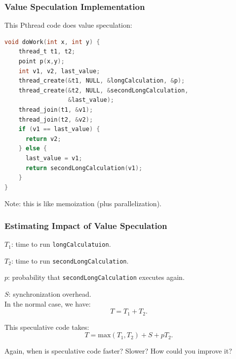 \begin{frame}[fragile]
  \frametitle{Value Speculation Implementation}

  
  This Pthread code does value speculation:
  
  \begin{lstlisting}[language=C]
void doWork(int x, int y) {
    thread_t t1, t2;
    point p(x,y);
    int v1, v2, last_value;
    thread_create(&t1, NULL, &longCalculation, &p);
    thread_create(&t2, NULL, &secondLongCalculation,
                  &last_value);
    thread_join(t1, &v1);
    thread_join(t2, &v2);
    if (v1 == last_value) {
      return v2;
    } else {
      last_value = v1;
      return secondLongCalculation(v1);
    }
}
  \end{lstlisting}

  Note: this is like memoization (plus parallelization).
  
\end{frame}

\begin{frame}
  \frametitle{Estimating Impact of Value Speculation}

  
  $T_1$: time to run {\tt longCalculatuion}.

  $T_2$: time to run {\tt secondLongCalculation}.

  $p$: probability that {\tt secondLongCalculation} executes again.

  $S$: synchronization overhead.\\[1em]

  In the normal case, we have:
    \[ T = T_1 +T_2.\]

  This speculative code takes:
    \[ T = \mbox{max}(T_1, T_2) + S + pT_2.\]

     Again, when is speculative code faster? Slower? How could you improve it?

  
\end{frame}

